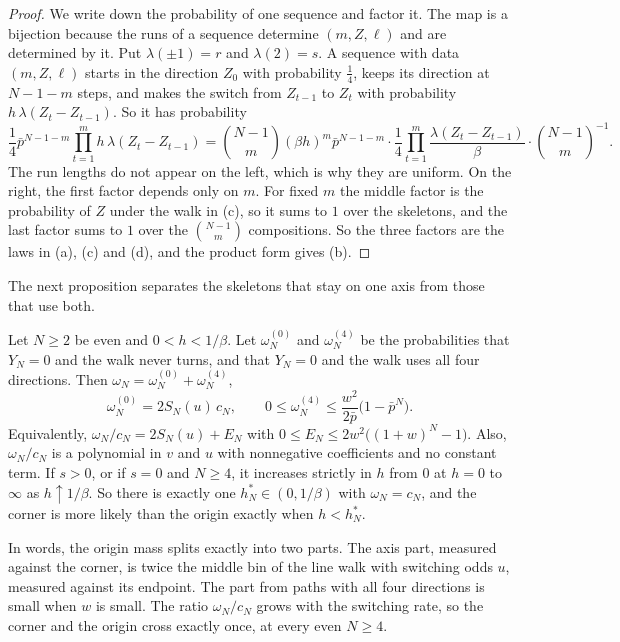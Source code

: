 \begin{proof}
We write down the probability of one sequence and factor it. The map is a bijection because the
runs of a sequence determine $(m,Z,\ell)$ and are determined by it. Put $\lambda(\pm1)=r$ and $\lambda(2)=s$.
A sequence with data $(m,Z,\ell)$ starts in the direction $Z_0$ with probability $\frac14$, keeps
its direction at $N-1-m$ steps, and makes the switch from $Z_{t-1}$ to $Z_t$ with probability
$h\,\lambda(Z_t-Z_{t-1})$. So it has probability
\[
 \frac14\bar p^{N-1-m}\prod_{t=1}^mh\,\lambda(Z_t-Z_{t-1})
 =\binom{N-1}m(\beta h)^m\bar p^{N-1-m}\cdot\frac14\prod_{t=1}^m\frac{\lambda(Z_t-Z_{t-1})}\beta
 \cdot\binom{N-1}m^{-1}.
\]
The run lengths do not appear on the left, which is why they are uniform. On the right, the first
factor depends only on $m$. For fixed $m$ the middle factor is the probability of $Z$ under the walk
in (c), so it sums to $1$ over the skeletons, and the last factor sums to $1$ over the
$\binom{N-1}m$ compositions. So the three factors are the laws in (a), (c) and (d), and the product
form gives (b).
\end{proof}

The next proposition separates the skeletons that stay on one axis from those
that use both.

\begin{proposition}\label{prop:decomp}
Let $N\ge2$ be even and $0<h<1/\beta$. Let $\omega^{(0)}_N$ and $\omega^{(4)}_N$ be the probabilities that
$Y_N=0$ and the walk never turns, and that $Y_N=0$ and the walk uses all four directions. Then
$\omega_N=\omega^{(0)}_N+\omega^{(4)}_N$,
\[
 \omega^{(0)}_N=2S_N(u)\,c_N,\qquad 0\le \omega^{(4)}_N\le\frac{w^2}{2\bar p}\bigl(1-\bar p^N\bigr).
\]
Equivalently, $\omega_N/c_N=2S_N(u)+E_N$ with $0\le E_N\le2w^2\bigl((1+w)^N-1\bigr)$. Also, $\omega_N/c_N$
is a polynomial in $v$ and $u$ with nonnegative coefficients and no constant term. If $s>0$, or if
$s=0$ and $N\ge4$, it increases strictly in $h$ from $0$ at $h=0$ to $\infty$ as $h\uparrow1/\beta$.
So there is exactly one $h^*_N\in(0,1/\beta)$ with $\omega_N=c_N$, and the corner is more likely than the
origin exactly when $h<h^*_N$.
\end{proposition}

In words, the origin mass splits exactly into two parts. The axis part,
measured against the corner, is twice the middle bin of the line walk with
switching odds $u$, measured against its endpoint. The part from paths with all
four directions is small when $w$ is small. The ratio
$\omega_N/c_N$ grows with the switching rate, so the corner and the origin cross
exactly once, at every even $N\ge4$.

